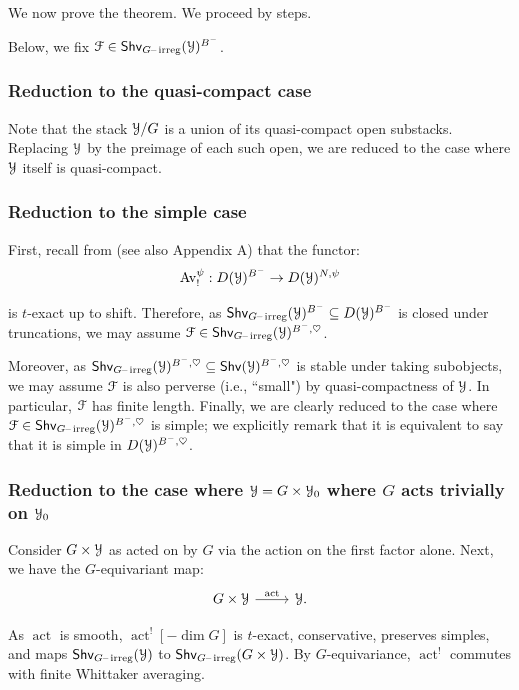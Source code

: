 \documentclass[reqno,11pt]{amsart}
\numberwithin{equation}{subsection}
\theoremstyle{remark}
\newcounter{steps}[thm]
\newcommand{\sF}{{\EuScript F}}
\newcommand{\sY}{{\EuScript Y}}
\newcommand{\on}{\operatorname}
\newcommand{\mathendash}{\text{\textendash}}
\newcommand{\act}{\on{act}}
\newcommand{\heart}{\heartsuit}
\newcommand{\Av}{\on{Av}}
\renewcommand{\subset}{\subseteq}
\newcommand{\Shv}{\mathsf{Shv}}
\newcommand{\irreg}{\on{irreg}}
\newcommand{\Girreg}{G\mathendash\irreg}
\begin{document}
We now prove the theorem. We proceed by steps.

Below, we fix $\sF \in \Shv_{\Girreg}(\sY)^{B^-}$.

\subsubsection{Reduction to the quasi-compact case}

Note that the stack $\sY/G$ is a union of its 
quasi-compact open substacks. Replacing $\sY$ by the preimage
of each such open, we are reduced to the case where
$\sY$ itself is quasi-compact.

\subsubsection{Reduction to the simple case}

First, recall from \cite{bbm} (see also \cite{b-function} Appendix A) 
that the functor:
%
\[
\Av_!^{\psi}:D(\sY)^{B^-} \to D(\sY)^{N,\psi}
\]

\noindent is $t$-exact up to shift. Therefore, as 
$\Shv_{\Girreg}(\sY)^{B^-} \subset D(\sY)^{B^-}$ is closed under
truncations, we may assume $\sF \in \Shv_{\Girreg}(\sY)^{B^-,\heart}$.

Moreover, as $\Shv_{\Girreg}(\sY)^{B^-,\heart} \subset \Shv(\sY)^{B^-,\heart}$
is stable under taking subobjects, we may assume $\sF$ is also perverse
(i.e., ``small") by quasi-compactness of $\sY$. In particular, $\sF$ has finite length. 
Finally, we are clearly reduced to the case where 
$\sF \in \Shv_{\Girreg}(\sY)^{B^-,\heart}$ is simple; 
we explicitly remark that it is equivalent to say that
it is simple in $D(\sY)^{B^-,\heart}$.

\subsubsection{Reduction to the case where $\sY = G \times \sY_0$ where
$G$ acts trivially on $\sY_0$}

Consider $G \times \sY$ as acted on by $G$ via the action on the
first factor alone. 
Next, we have the $G$-equivariant map:
%
\[
\begin{tikzcd}
G \times \sY \arrow[r,"\act"] & \sY.
\end{tikzcd} 
\]

\noindent As $\act$ is smooth, $\act^![-\dim G]$ 
is $t$-exact, conservative, preserves simples, and maps 
$\Shv_{\Girreg}(\sY)$ to $\Shv_{\Girreg}(G \times \sY)$.
By $G$-equivariance, $\act^!$ commutes with finite Whittaker averaging.
\end{document}
